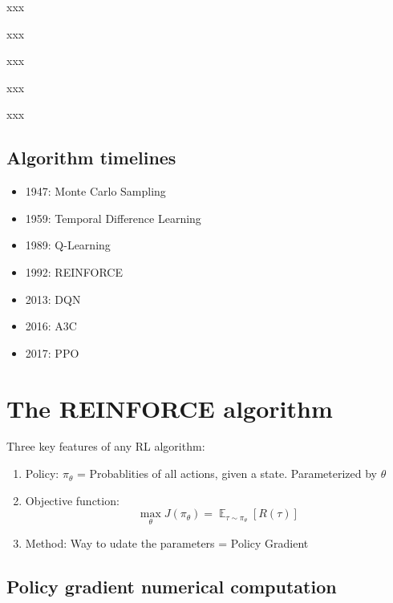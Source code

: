 \documentclass[]{article}
\begin{document}
xxx \par
xxx \par
xxx \par
xxx \par
xxx \par

\subsection{Algorithm timelines}
\begin{itemize}
	\item 1947: Monte Carlo Sampling
	\item 1959: Temporal Difference Learning
	\item 1989: Q-Learning
	\item 1992: REINFORCE
	\item 2013: DQN
	\item 2016: A3C
	\item 2017: PPO 
\end{itemize}

\section{The REINFORCE algorithm}
Three key features of any RL algorithm:
\begin{enumerate}
	\item Policy: $\pi_\theta$ = Probablities of all actions, given a state. Parameterized by $\theta$
	\item Objective function:
	\begin{equation}
		\max_{\theta} J(\pi_{\theta}) = \mathop{\mathbb{E}}_{\tau \sim \pi_\theta} [R(\tau)]
	\end{equation}
	\item Method: Way to udate the parameters = Policy Gradient

\end{enumerate}

\subsection{Policy gradient numerical computation}
\end{document}
